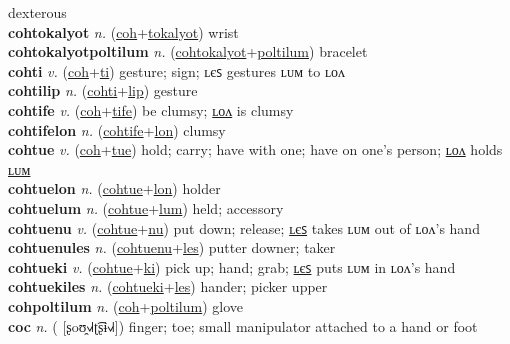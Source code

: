 dexterous \label{cohlusolon} \\
\textbf{cohtokalyot} \textit{n.} (\hyperref[coh]{coh}+\hyperref[tokalyot]{tokalyot})
wrist \label{cohtokalyot} \\
\textbf{cohtokalyotpoltilum} \textit{n.} (\hyperref[cohtokalyot]{cohtokalyot}+\hyperref[poltilum]{poltilum})
bracelet \label{cohtokalyotpoltilum} \\
\textbf{cohti} \textit{v.} (\hyperref[coh]{coh}+\hyperref[ti]{ti})
gesture; sign; ʟєꜱ gestures ʟᴜᴍ to ʟᴏᴧ \label{cohti} \\
\textbf{cohtilip} \textit{n.} (\hyperref[cohti]{cohti}+\hyperref[lip]{lip})
gesture \label{cohtilip} \\
\textbf{cohtife} \textit{v.} (\hyperref[coh]{coh}+\hyperref[tife]{tife})
be clumsy; \hyperref[cohtifelon]{ʟᴏᴧ} is clumsy \label{cohtife} \\
\textbf{cohtifelon} \textit{n.} (\hyperref[cohtife]{cohtife}+\hyperref[lon]{lon})
clumsy \label{cohtifelon} \\
\textbf{cohtue} \textit{v.} (\hyperref[coh]{coh}+\hyperref[tue]{tue})
hold; carry; have with one; have on one’s person; \hyperref[cohtuelon]{ʟᴏᴧ} holds \hyperref[cohtuelum]{ʟᴜᴍ} \label{cohtue} \\
\textbf{cohtuelon} \textit{n.} (\hyperref[cohtue]{cohtue}+\hyperref[lon]{lon})
holder \label{cohtuelon} \\
\textbf{cohtuelum} \textit{n.} (\hyperref[cohtue]{cohtue}+\hyperref[lum]{lum})
held; accessory \label{cohtuelum} \\
\textbf{cohtuenu} \textit{v.} (\hyperref[cohtue]{cohtue}+\hyperref[nu]{nu})
put down; release; \hyperref[cohtuenules]{ʟєꜱ} takes ʟᴜᴍ out of ʟᴏᴧ’s hand \label{cohtuenu} \\
\textbf{cohtuenules} \textit{n.} (\hyperref[cohtuenu]{cohtuenu}+\hyperref[les]{les})
putter downer; taker \label{cohtuenules} \\
\textbf{cohtueki} \textit{v.} (\hyperref[cohtue]{cohtue}+\hyperref[ki]{ki})
pick up; hand; grab; \hyperref[cohtuekiles]{ʟєꜱ} puts ʟᴜᴍ in ʟᴏᴧ’s hand \label{cohtueki} \\
\textbf{cohtuekiles} \textit{n.} (\hyperref[cohtueki]{cohtueki}+\hyperref[les]{les})
hander; picker upper \label{cohtuekiles} \\
\textbf{cohpoltilum} \textit{n.} (\hyperref[coh]{coh}+\hyperref[poltilum]{poltilum})
glove \label{cohpoltilum} \\
\textbf{coc} \textit{n.} ( [ʂoʊ̯˧˩˧ʈ͡ʂɨ˧˩˧])
finger; toe; small manipulator attached to a hand or foot \label{coc} \\
